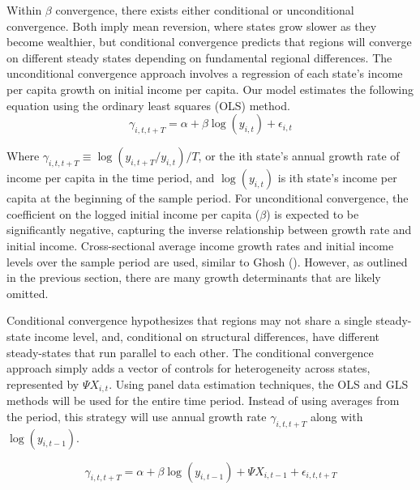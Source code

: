 \documentclass[a4paper, 11pt]{article}
\begin{document}
  Within $\beta$ convergence, there exists either conditional or unconditional convergence.  Both imply mean reversion, where states grow slower as they become wealthier, but conditional convergence predicts that regions will converge on different steady states depending on fundamental regional differences.  The unconditional convergence approach involves a regression of each state’s income per capita growth on initial income per capita.  Our model estimates the following equation using the ordinary least squares (OLS) method.  
$$ \gamma_{i,t,t+T} = \alpha + \beta\log(y_{i,t}) + \epsilon_{i,t}$$

Where $\gamma_{i,t,t+T} \equiv \log(y_{i,t+T}/y_{i,t})/T$, or the ith state’s annual growth rate of income per capita in the time period, and $\log(y_{i,t})$ is ith state’s income per capita at the beginning of the sample period.  For unconditional convergence, the coefficient on the logged initial income per capita ($\beta$) is expected to be significantly negative, capturing the inverse relationship between growth rate and initial income.  Cross-sectional average income growth rates and initial income levels over the sample period are used, similar to Ghosh (\citeyear{ghosh_economic_2008}).  However, as outlined in the previous section, there are many growth determinants that are likely omitted.\par   
Conditional convergence hypothesizes that regions may not share a single steady-state income level, and, conditional on structural differences, have different steady-states that run parallel to each other.  The conditional convergence approach simply adds a vector of controls for heterogeneity across states, represented by $\Psi X_{i,t}$.  Using panel data estimation techniques, the OLS and GLS methods will be used for the entire time period.  Instead of using averages from the period, this strategy will use annual growth rate $\gamma_{i,t,t+T}$ along with $\log(y_{i,t-1})$. 

$$ \gamma_{i,t,t+T} = \alpha + \beta\log(y_{i,t-1}) + \Psi X_{i,t-1} + \epsilon_{i,t,t+T}$$
\end{document}
